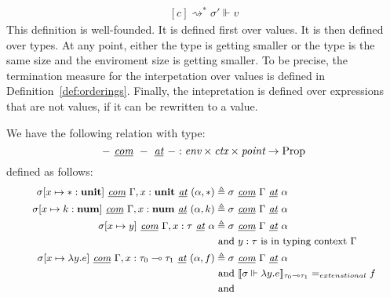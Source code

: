 \begin{definition}
\begin{equation}
\begin{aligned}[c]
{    \rightsquigarrow^* \sigma' \Vdash v}
  \end{aligned}
  \end{equation}
  This definition is well-founded. It is defined first over values. It is then
  defined over types. At any point, either the type is getting smaller or the
  type is the same size and the enviroment size is getting smaller. To be
  precise, the termination measure for the interpetation over values is defined
  in Definition~\ref{def:orderings}. Finally, the intepretation is defined over
  expressions that are not values, if it can be rewritten to a value.
\end{definition}

\begin{definition}
  We have the following relation with type:
  $$- \textit{ \underline{com} } - \textit{ \underline{at} } - : \textit{env}
  \times \textit{ctx} \times \textit{point} \to \text{Prop}$$ 
  defined as follows:
  \begin{equation}
    \begin{small}
    \begin{aligned}[c] 
      \sigma[x \mapsto * : \textbf{unit}] \textit{ \underline{com} } \Gamma, x:
      \textbf{unit} \textit{ \underline{at} } (\alpha, *) &\triangleq \sigma
      \textit{ \underline{com} } \Gamma \textit{ \underline{at} } \alpha \\
      \sigma[x \mapsto k : \textbf{num}] \textit{ \underline{com} } \Gamma, x:
      \textbf{num} \textit{ \underline{at} } (\alpha, k) &\triangleq \sigma
      \textit{ \underline{com} } \Gamma \textit{ \underline{at} } \alpha \\
      \sigma[x \mapsto y] \textit{ \underline{com} } \Gamma, x : \tau \textit{
        \underline{at} } \alpha &\triangleq \sigma \textit{ \underline{com} }
      \Gamma \textit{ \underline{at} } \alpha \\
      & \text{ and } y : \tau \text{ is in typing context } \Gamma \\
      \sigma[x \mapsto \lambda y . e] \textit{ \underline{com} } \Gamma, x :
      \tau_0 \multimap \tau_1 \textit{ \underline{at} } (\alpha, f) &\triangleq
      \sigma \textit{ \underline{com} } \Gamma \textit{ \underline{at} } \alpha
      \\ & \text{ and } \llbracket \sigma \Vdash \lambda y . e
      \rrbracket_{\tau_0 \multimap \tau_1} =_{extenstional} f \\ & \text{ and }

\end{aligned}
\end{small}
\end{equation}
\end{definition}
